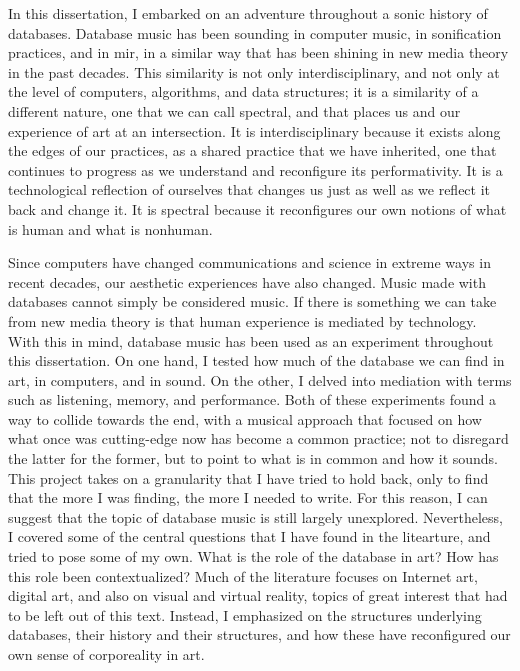 In this dissertation, I embarked on an adventure throughout a sonic history of databases. Database music has been sounding in computer music, in sonification practices, and in \gls{mir}, in a similar way that has been shining in new media theory in the past decades. This similarity is not only interdisciplinary, and not only at the level of computers, algorithms, and data structures; it is a similarity of a different nature, one that we can call spectral, and that places us and our experience of art at an intersection. It is interdisciplinary because it exists along the edges of our practices, as a shared practice that we have inherited, one that continues to progress as we understand and reconfigure its performativity. It is a technological reflection of ourselves that changes us just as well as we reflect it back and change it. It is spectral because it reconfigures our own notions of what is human and what is nonhuman.

Since computers have changed communications and science in extreme ways in recent decades, our aesthetic experiences have also changed. Music made with databases cannot simply be considered music. If there is something we can take from new media theory is that human experience is mediated by technology. With this in mind, database music has been used as an experiment throughout this dissertation. On one hand, I tested how much of the database we can find in art, in computers, and in sound. On the other, I delved into mediation with terms such as listening, memory, and performance. Both of these experiments found a way to collide towards the end, with a musical approach that focused on how what once was cutting-edge now has become a common practice; not to disregard the latter for the former, but to point to what is in common and how it sounds. This project takes on a granularity that I have tried to hold back, only to find that the more I was finding, the more I needed to write. For this reason, I can suggest that the topic of database music is still largely unexplored. Nevertheless, I covered some of the central questions that I have found in the litearture, and tried to pose some of my own. What is the role of the database in art? How has this role been contextualized? Much of the literature focuses on Internet art, digital art, and also on visual and virtual reality, topics of great interest that had to be left out of this text. Instead, I emphasized on the structures underlying databases, their history and their structures, and how these have reconfigured our own sense of corporeality in art. 


